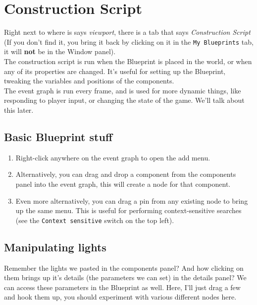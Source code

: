 \documentclass{article}
\begin{document}
\section{Construction Script}
Right next to where is says \emph{viewport}, there is a tab that says \emph{Construction Script} (If you don't find it, you bring it back by clicking on it in the \verb|My Blueprints| tab, it will \textbf{not} be in the Window panel). \\[10pt] 
The construction script is run when the Blueprint is placed in the world, or when any of its properties are changed. It's useful for setting up the Blueprint, tweaking the variables and positions of the components. \\[10pt]
The event graph is run every frame, and is used for more dynamic things, like responding to player input, or changing the state of the game. We'll talk about this later.

\subsection{Basic Blueprint stuff}


\begin{enumerate}
    \item Right-click anywhere on the event graph to open the add menu. 
    \item Alternatively, you can drag and drop a component from the components panel into the event graph, this will create a node for that component.
    \item Even more alternatively, you can drag a pin from any existing node to bring up the same menu. This is useful for performing context-sensitive searches (see the \verb|Context sensitive| switch on the top left).
\end{enumerate}
\newpage
\subsection{Manipulating lights}
Remember the lights we pasted in the components panel? And how clicking on them brings up it's details (the parameters we can set) in the details panel? We can access these parameters in the Blueprint as well. Here, I'll just drag a few and hook them up, you should experiment with various different nodes here.

\newpage
\end{document}
